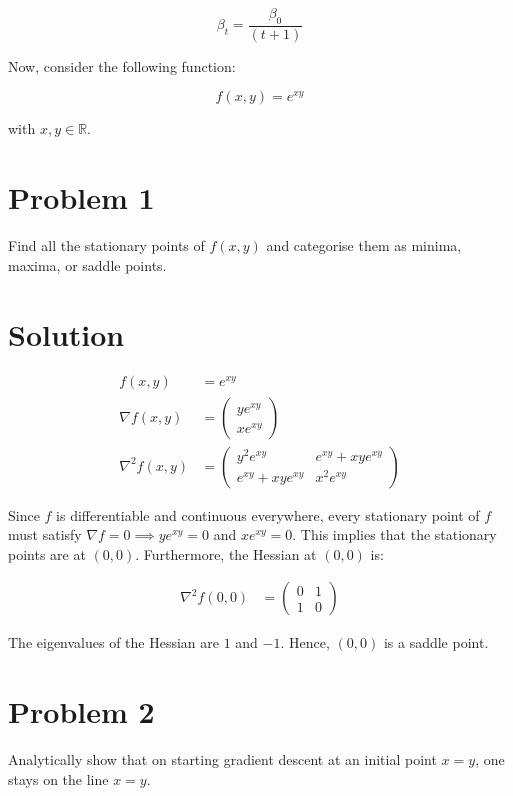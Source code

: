 \documentclass{article}
\begin{document}
$$ \beta_t = \frac{\beta_0}{(t + 1)}$$

Now, consider the following function:

$$f(x, y) = e^{xy}$$

with $x, y \in \mathbb{R}$.

\section*{Problem 1}

Find all the stationary points of $f(x, y)$ and categorise them as minima, maxima, or saddle points.

\section*{Solution}

\begin{align*}
    f(x, y) &= e^{xy} \\
    \nabla f(x, y) &= \begin{pmatrix}
        ye^{xy} \\
        xe^{xy}
    \end{pmatrix} \\
    \nabla^2 f(x, y) &= \begin{pmatrix}
        y^2e^{xy} & e^{xy} + xye^{xy} \\
        e^{xy} + xye^{xy} & x^2e^{xy}
    \end{pmatrix}
\end{align*}

Since $f$ is differentiable and continuous everywhere, every stationary point of $f$ must satisfy $\nabla f = 0 \implies ye^{xy} = 0$ and $xe^{xy} = 0$. This implies that the stationary points are at $(0, 0)$. Furthermore, the Hessian at $(0, 0)$ is:

\begin{align*}
    \nabla^2 f(0, 0) &= \begin{pmatrix}
        0 & 1 \\
        1 & 0
    \end{pmatrix}
\end{align*}

The eigenvalues of the Hessian are $1$ and $-1$. Hence, $(0, 0)$ is a saddle point.

\section*{Problem 2}

Analytically show that on starting gradient descent at an initial point $x = y$, one
stays on the line $x = y$.
\end{document}
